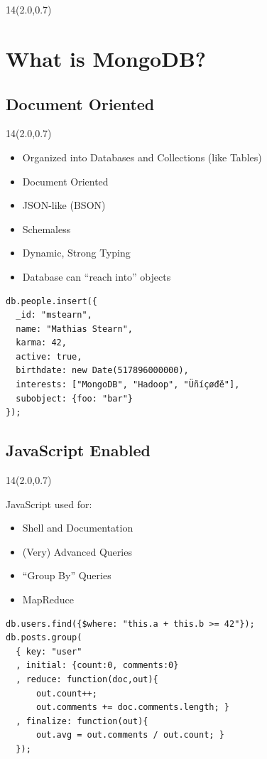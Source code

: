 \documentclass{beamer}
\newcommand{\MongoLogo}{
\begin{textblock}{14}(2.0,0.7)
  \pgfuseimage{logo}
\end{textblock}
}
\begin{document}
\section[Outline]{}
\begin{frame}
  \MongoLogo
  \tableofcontents
\end{frame}

\section{What is MongoDB?}
\subsection{Document Oriented}
\begin{frame}[fragile]
  \MongoLogo
  \begin{itemize}
    \item Organized into Databases and Collections (like Tables)
    \item Document Oriented
    \item JSON-like (BSON)
    \item Schemaless
    \item Dynamic, Strong Typing
    \item Database can ``reach into'' objects
  \end{itemize}

  \begin{small}
  \begin{verbatim}
db.people.insert({
  _id: "mstearn",
  name: "Mathias Stearn",
  karma: 42,
  active: true,
  birthdate: new Date(517896000000),
  interests: ["MongoDB", "Hadoop", "Üñíçøđĕ"],
  subobject: {foo: "bar"}
});
  \end{verbatim}
  \end{small}

\end{frame}

\subsection{JavaScript Enabled}
\begin{frame}[fragile]
  \MongoLogo
  JavaScript used for:
  \begin{itemize}
    \item Shell and Documentation
    \item (Very) Advanced Queries
    \item ``Group By'' Queries
    \item MapReduce
  \end{itemize}

  \begin{verbatim}
db.users.find({$where: "this.a + this.b >= 42"});
db.posts.group(
  { key: "user"
  , initial: {count:0, comments:0}
  , reduce: function(doc,out){
      out.count++;
      out.comments += doc.comments.length; }
  , finalize: function(out){ 
      out.avg = out.comments / out.count; }
  });
  \end{verbatim}
\end{frame}
\end{document}
